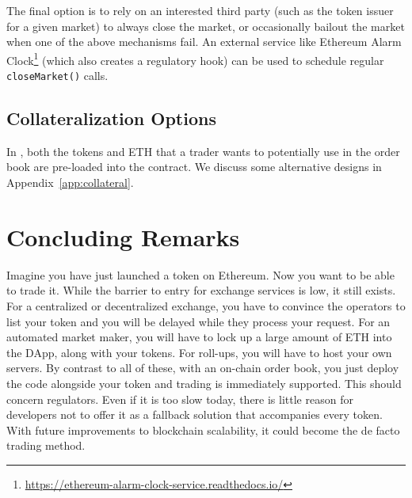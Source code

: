 The final option is to rely on an interested third party (such as the token issuer for a given market) to always close the market, or  occasionally bailout the market when one of the above mechanisms fail. An external service like Ethereum Alarm Clock\footnote{\url{https://ethereum-alarm-clock-service.readthedocs.io/}}  (which also creates a regulatory hook) can be used to schedule regular \texttt{closeMarket()} calls.


\subsection{Collateralization Options}

In \cm, both the tokens and ETH that a trader wants to potentially use in the order book are pre-loaded into the contract. We discuss some alternative designs in Appendix~\ref{app:collateral}.






\section{Concluding Remarks}

Imagine you have just launched a token on Ethereum. Now you want to be able to trade it. While the barrier to entry for exchange services is low, it still exists. For a centralized or decentralized exchange, you have to convince the operators to list your token and you will be delayed while they process your request. For an automated market maker, you will have to lock up a large amount of ETH into the DApp, along with your tokens. For roll-ups, you will have to host your own servers. By contrast to all of these, with an on-chain order book, you just deploy the code alongside your token and trading is immediately supported. This should concern regulators. Even if it is too slow today, there is little reason for developers not to offer it as a fallback solution that accompanies every token. With future improvements to blockchain scalability, it could become the de facto trading method.






